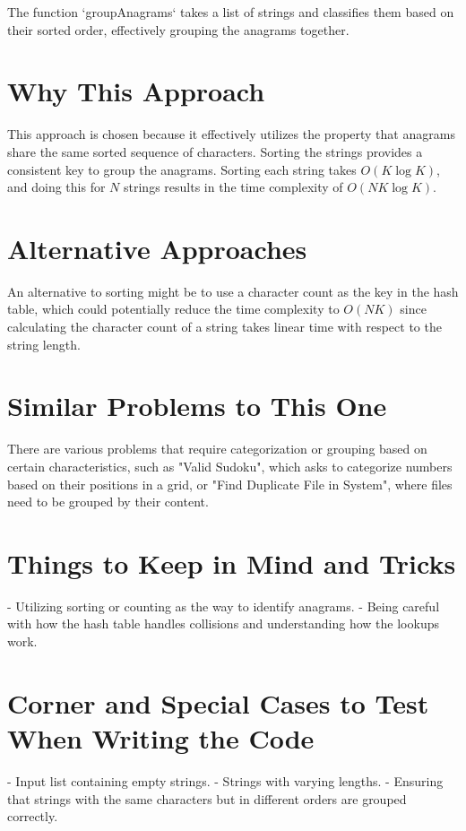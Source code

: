 The function `groupAnagrams` takes a list of strings and classifies them based on their sorted order, effectively grouping the anagrams together.

\section*{Why This Approach}
This approach is chosen because it effectively utilizes the property that anagrams share the same sorted sequence of characters. Sorting the strings provides a consistent key to group the anagrams. Sorting each string takes \(O(K \log K)\), and doing this for \(N\) strings results in the time complexity of \(O(NK \log K)\).

\section*{Alternative Approaches}
An alternative to sorting might be to use a character count as the key in the hash table, which could potentially reduce the time complexity to \(O(NK)\) since calculating the character count of a string takes linear time with respect to the string length.

\section*{Similar Problems to This One}
There are various problems that require categorization or grouping based on certain characteristics, such as "Valid Sudoku", which asks to categorize numbers based on their positions in a grid, or "Find Duplicate File in System", where files need to be grouped by their content.

\section*{Things to Keep in Mind and Tricks}
- Utilizing sorting or counting as the way to identify anagrams.
- Being careful with how the hash table handles collisions and understanding how the lookups work.

\section*{Corner and Special Cases to Test When Writing the Code}
- Input list containing empty strings.
- Strings with varying lengths.
- Ensuring that strings with the same characters but in different orders are grouped correctly.